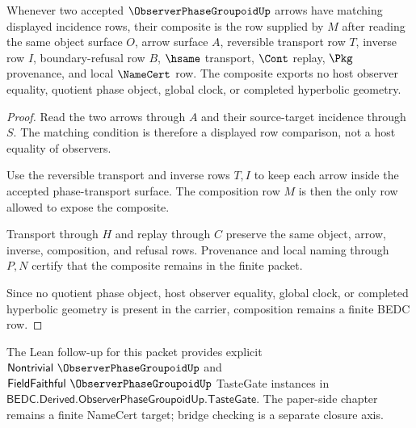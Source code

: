 \begin{theorem}
\label{thm:observer-phase-groupoid-transport-composition}
Whenever two accepted $\ObserverPhaseGroupoidUp$ arrows have matching displayed incidence rows, their composite is the row supplied by $M$ after reading the same object surface $O$, arrow surface $A$, reversible transport row $T$, inverse row $I$, boundary-refusal row $B$, $\hsame$ transport, $\Cont$ replay, $\Pkg$ provenance, and local $\NameCert$ row. The composite exports no host observer equality, quotient phase object, global clock, or completed hyperbolic geometry.
\end{theorem}
\begin{proof}
Read the two arrows through $A$ and their source-target incidence through $S$. The matching condition is therefore a displayed row comparison, not a host equality of observers.

Use the reversible transport and inverse rows $T,I$ to keep each arrow inside the accepted phase-transport surface. The composition row $M$ is then the only row allowed to expose the composite.

Transport through $H$ and replay through $C$ preserve the same object, arrow, inverse, composition, and refusal rows. Provenance and local naming through $P,N$ certify that the composite remains in the finite packet.

Since no quotient phase object, host observer equality, global clock, or completed hyperbolic geometry is present in the carrier, composition remains a finite BEDC row.
\end{proof}



The Lean follow-up for this packet provides explicit $\mathsf{Nontrivial}\ \ObserverPhaseGroupoidUp$ and $\mathsf{FieldFaithful}\ \ObserverPhaseGroupoidUp$ TasteGate instances in $\mathsf{BEDC.Derived.ObserverPhaseGroupoidUp.TasteGate}$. The paper-side chapter remains a finite NameCert target; bridge checking is a separate closure axis.

